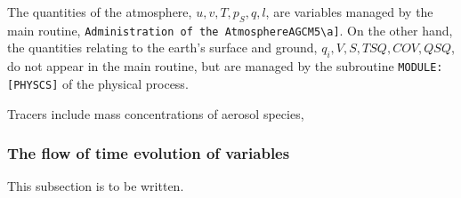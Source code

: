 The quantities of the atmosphere, \(u, v, T, p_S, q, l\), are variables
managed by the main routine,
\texttt{Administration\ of\ the\ Atmosphere\textquotesingle{}{[}AGCM5\textbackslash{}a{]}}.
On the other hand, the quantities relating to the earth's surface and
ground, \(q_i, V, S, TSQ, COV, QSQ\), do not appear in the main routine,
but are managed by the subroutine \texttt{MODULE:{[}PHYSCS{]}} of the
physical process.

Tracers include mass concentrations of aerosol species,

\hypertarget{the-flow-of-time-evolution-of-variables}{%
\subsubsection{The flow of time evolution of
variables}\label{the-flow-of-time-evolution-of-variables}}

This subsection is to be written.
